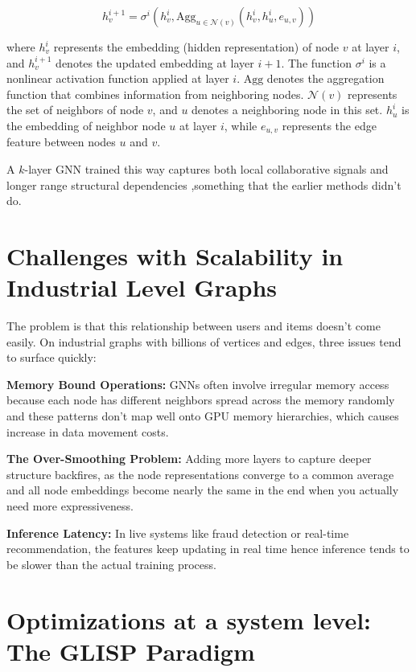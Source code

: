 \begin{equation}
h_{v}^{i+1}=\sigma^{i}\left(h_{v}^{i},
\text{Agg}_{u\in\mathcal{N}(v)}
\left(h_{v}^{i},h_{u}^{i},e_{u,v}\right)\right)
\end{equation}

where $h_v^{i}$ represents the embedding (hidden representation) of node $v$ at layer $i$, 
and $h_v^{i+1}$ denotes the updated embedding at layer $i+1$. 
The function $\sigma^{i}$ is a nonlinear activation function applied at layer $i$. 
$\text{Agg}$ denotes the aggregation function that combines information from neighboring nodes. 
$\mathcal{N}(v)$ represents the set of neighbors of node $v$, and $u$ denotes a neighboring node in this set. 
$h_u^{i}$ is the embedding of neighbor node $u$ at layer $i$, while $e_{u,v}$ represents the edge feature between nodes $u$ and $v$.\cite{gilmer2017neural}

A $k$-layer GNN trained this way captures both local collaborative signals and longer range structural dependencies ,something that the earlier methods didn’t do.

\section{Challenges with Scalability in Industrial Level Graphs}

The problem is that this relationship between users and items doesn’t come easily. On industrial graphs with billions of vertices and edges, three issues tend to surface quickly:

\textbf{Memory Bound Operations:} GNNs often involve irregular memory access because each node has different neighbors spread across the memory randomly and these patterns don’t map well onto GPU memory hierarchies, which causes increase in data movement costs.

\textbf{The Over-Smoothing Problem:}  Adding more layers to capture deeper structure
backfires, as the node representations converge to a common average and all node embeddings become nearly the same in the end when you actually need more expressiveness.\cite{Toppingetal2022}

\textbf{Inference Latency:} In live systems like fraud detection or real-time recommendation, the features keep updating in real time hence inference tends to be slower than the actual training process.

\section{Optimizations at a system level: The GLISP Paradigm}

